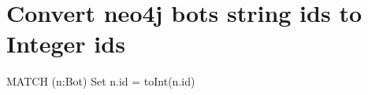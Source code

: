\section*{Convert neo4j bots string ids to Integer ids}


\begin{DoxyCode}
MATCH (n:Bot) Set n.id = toInt(n.id)
\end{DoxyCode}
 